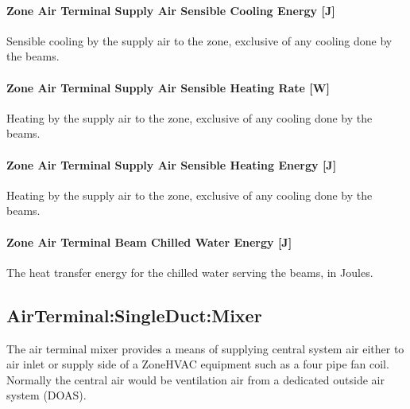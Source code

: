 \paragraph{Zone Air Terminal Supply Air Sensible Cooling Energy {[}J{]}}\label{zone-air-terminal-supply-air-sensible-cooling-energy-j}

Sensible cooling by the supply air to the zone, exclusive of any cooling done by the beams.

\paragraph{Zone Air Terminal Supply Air Sensible Heating Rate {[}W{]}}\label{zone-air-terminal-supply-air-sensible-heating-rate-w}

Heating by the supply air to the zone, exclusive of any cooling done by the beams.

\paragraph{Zone Air Terminal Supply Air Sensible Heating Energy {[}J{]}}\label{zone-air-terminal-supply-air-sensible-heating-energy-j}

Heating by the supply air to the zone, exclusive of any cooling done by the beams.

\paragraph{Zone Air Terminal Beam Chilled Water Energy {[}J{]}}\label{zone-air-terminal-beam-chilled-water-energy-j}

The heat transfer energy for the chilled water serving the beams, in Joules.

\subsection{AirTerminal:SingleDuct:Mixer}\label{airterminalsingleductmixer}

The air terminal mixer provides a means of supplying central system air either to air inlet or supply side of a ZoneHVAC equipment such as a four pipe fan coil. Normally the central air would be ventilation air from a dedicated outside air system (DOAS).

